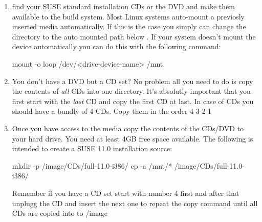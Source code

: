 \begin{enumerate}
\item find your SUSE standard installation CDs or the DVD and
      make them available to the build system. Most Linux systems
      auto-mount a previosly inserted media automatically. If this
      is the case you simply can change the directory to the
      auto mounted path below . If your system doesn't mount
      the device automatically you can do this with the following
      command:

\begin{Command}{12cm}
mount -o loop /dev/<drive-device-name> /mnt
\end{Command}

\item You don't have a DVD but a CD set? No problem all you need to
      do is copy the contents of \emph{all} CDs into one directory. It's
      absolutly important that you first start with the \emph{last} CD and
      copy the first CD at last. In case of CDs you should have a
      bundly of 4 CDs. Copy them in the order 4 3 2 1

\item Once you have access to the media copy the contents of the
      CDs/DVD to your hard drive. You need at least 4GB free
      space available. The following is intended to create a SUSE
      11.0 installation source:

\begin{Command}{12cm}
mkdir -p /image/CDs/full-11.0-i386/
cp -a /mnt/* /image/CDs/full-11.0-i386/
\end{Command}

      Remember if you have a CD set start with number 4 first and
      after that unplugg the CD and insert the next one to repeat
      the copy command until all CDs are copied into to /image
\end{enumerate}

